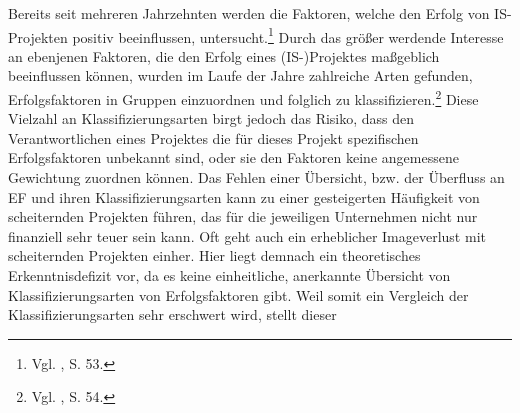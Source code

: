 Bereits seit mehreren Jahrzehnten werden die Faktoren, welche den Erfolg von IS-\-Pro\-jek\-ten positiv beeinflussen, untersucht.\footnote{Vgl. \cite{Fortune.2006}, S. 53.}
Durch das größer werdende Interesse an ebenjenen Faktoren, die den Erfolg eines (IS-)Projektes maßgeblich 
beeinflussen können, wurden im Laufe der Jahre zahlreiche Arten gefunden, Erfolgsfaktoren in Gruppen einzuordnen und folglich 
zu klassifizieren.\footnote{Vgl. \cite{Fortune.2006}, S. 54.} %
Diese Vielzahl an Klassifizierungsarten birgt jedoch das Risiko, dass den Verantwortlichen 
eines Projektes die für dieses Projekt spezifischen Erfolgsfaktoren unbekannt sind, 
oder sie den Faktoren keine angemessene Gewichtung zuordnen 
können. Das Fehlen einer Übersicht, bzw. der Überfluss an EF und ihren Klassifizierungsarten kann zu einer gesteigerten 
Häufigkeit von scheiternden Projekten führen, das für die jeweiligen Unternehmen nicht nur finanziell sehr teuer sein kann.
Oft geht auch ein erheblicher Imageverlust mit scheiternden Projekten einher. 
Hier liegt demnach ein theoretisches Erkenntnisdefizit vor, da es keine einheitliche, anerkannte Übersicht von 
Klassifizierungsarten von Erfolgsfaktoren gibt. Weil somit ein Vergleich der Klassifizierungsarten sehr erschwert wird, stellt dieser
